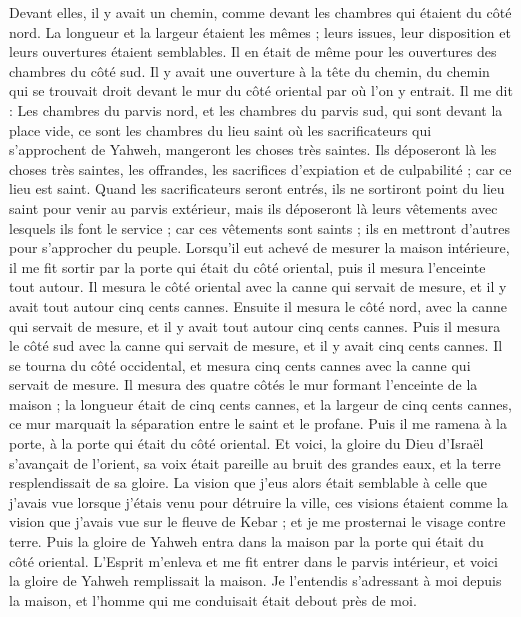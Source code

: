 \begin{multicols}{2}
Devant elles, il y avait un chemin, comme devant les chambres qui étaient du côté nord. La longueur et la largeur étaient les mêmes ; leurs issues, leur disposition et leurs ouvertures étaient semblables.
Il en était de même pour les ouvertures des chambres du côté sud. Il y avait une ouverture à la tête du chemin, du chemin qui se trouvait droit devant le mur du côté oriental par où l’on y entrait.
Il me dit : Les chambres du parvis nord, et les chambres du parvis sud, qui sont devant la place vide, ce sont les chambres du lieu saint où les sacrificateurs qui s’approchent de Yahweh, mangeront les choses très saintes. Ils déposeront là les choses très saintes, les offrandes, les sacrifices d’expiation et de culpabilité ; car ce lieu est saint.
Quand les sacrificateurs seront entrés, ils ne sortiront point du lieu saint pour venir au parvis extérieur, mais ils déposeront là leurs vêtements avec lesquels ils font le service ; car ces vêtements sont saints ; ils en mettront d’autres pour s’approcher du peuple.
Lorsqu'il eut achevé de mesurer la maison intérieure, il me fit sortir par la porte qui était du côté oriental, puis il mesura l’enceinte tout autour.
Il mesura le côté oriental avec la canne qui servait de mesure, et il y avait tout autour cinq cents cannes.
Ensuite il mesura le côté nord, avec la canne qui servait de mesure, et il y avait tout autour cinq cents cannes.
Puis il mesura le côté sud avec la canne qui servait de mesure, et il y avait cinq cents cannes.
Il se tourna du côté occidental, et mesura cinq cents cannes avec la canne qui servait de mesure.
Il mesura des quatre côtés le mur formant l’enceinte de la maison ; la longueur était de cinq cents cannes, et la largeur de cinq cents cannes, ce mur marquait la séparation entre le saint et le profane.
\VerseOne{}Puis il me ramena à la porte, à la porte qui était du côté oriental.
Et voici, la gloire du Dieu d'Israël s’avançait de l'orient, sa voix était pareille au bruit des grandes eaux, et la terre resplendissait de sa gloire\FTNT{}.
La vision que j'eus alors était semblable à celle que j'avais vue lorsque j'étais venu pour détruire la ville, ces visions étaient comme la vision que j'avais vue sur le fleuve de Kebar ; et je me prosternai le visage contre terre.
Puis la gloire de Yahweh entra dans la maison par la porte qui était du côté oriental.
L'Esprit m'enleva et me fit entrer dans le parvis intérieur, et voici la gloire de Yahweh remplissait la maison.
Je l'entendis s'adressant à moi depuis la maison, et l'homme qui me conduisait était debout près de moi.

\end{multicols}
